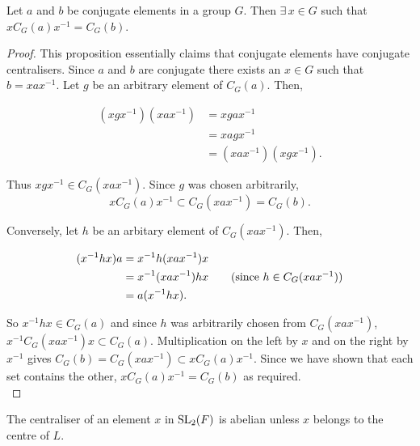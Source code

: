 

\begin{proposition}
    \label{conjugate_centralizers_of_IsConj}
    \leanok
    Let $a$ and $b$ be conjugate elements in a group $G$. Then $\exists \, x \in G$ such that $xC_G(a)x^{-1} = C_G(b)$. \vspace{3mm}
\end{proposition}

\begin{proof}
This proposition essentially claims that conjugate elements have conjugate centralisers. Since $a$ and $b$ are conjugate there exists an $x \! \in \! G$ such that $b = xax^{-1}$. Let $g$ be an arbitrary element of $C_G(a)$. Then,

\begin{align*} (xgx^{-1})(xax^{-1}) &= xgax^{-1}\\
&= xagx^{-1} \tag{since $g \in C_G(a)$}\\
&= (xax^{-1})(xgx^{-1}). \end{align*}

Thus $xgx^{-1} \in C_G(xax^{-1})$. Since $g$ was chosen arbitrarily, $$xC_G(a)x^{-1} \subset C_G(xax^{-1}) = C_G(b).$$ 

Conversely, let $h$ be an arbitary element of $C_G(xax^{-1})$. Then,

\begin{align*} (x^{-1}hx)a &= x^{-1}h(xax^{-1})x \\
&= x^{-1}(xax^{-1})hx \tag{since $h \in C_G(xax^{-1})$} \\
&= a(x^{-1}hx). \end{align*}

So $x^{-1}hx \in C_G(a)$ and since $h$ was arbitrarily chosen from $C_G(xax^{-1})$, \linebreak $x^{-1}C_G(xax^{-1})x \subset C_G(a)$. Multiplication on the left by $x$ and on the right by $x^{-1}$ gives $C_G(b) =  C_G(xax^{-1}) \subset xC_G(a)x^{-1}$. Since we have shown that each set contains the other, $xC_G(a)x^{-1} = C_G(b)$ as required. \\
\end{proof}



\begin{corollary}
    \label{IsCommutative_centralizer_of_not_mem_center}
    \leanok
The centraliser of an element $x$ in $\operatorname{SL}_2(F)$ is abelian unless $x$ belongs to the centre of $L$. \vspace{3mm}
\end{corollary}

